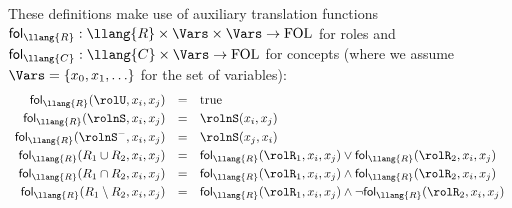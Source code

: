 \documentclass[10pt,a4paper]{amsart}
\theoremstyle{definition}
\numberwithin{equation}{section}
\theoremstyle{plain}
\theoremstyle{definition}
\theoremstyle{myexample}
\theoremstyle{plain}
\theoremstyle{definition}
\newcommand{\fcn}[1]{\mathsf{#1}}
\begin{document}
These definitions make use of auxiliary translation functions $ \fcn{fol}_ \llang{R}:  \llang{R} \times \Vars \times \Vars \to \mathrm{FOL}$ for roles and $ \fcn{fol}_ \llang{C}:  \llang{C} \times \Vars \to \mathrm{FOL}$ for concepts (where we assume $\Vars=\{x_0,x_1,\ldots\}$ for the set of variables):
\[
\begin{array}{rll}
	 \fcn{fol}_{ \llang{R}}(\rolU,x_i,x_j) & = & \mathrm{true} \\[1mm]
	 \fcn{fol}_{ \llang{R}}(\rolnS,x_i,x_j) & = & \rolnS(x_i,x_j) \\[1mm]
	 \fcn{fol}_{ \llang{R}}(\rolnS^-,x_i,x_j) & = & \rolnS(x_j,x_i) \\[1mm]
	 \fcn{fol}_{ \llang{R}}(R_1 \cup R_2,x_i,x_j) & = & \fcn{fol}_{ \llang{R}}(\rolR_1,x_i,x_j) \vee \fcn{fol}_{ \llang{R}}(\rolR_2,x_i,x_j) \\[1mm]
	 \fcn{fol}_{ \llang{R}}(R_1 \cap R_2,x_i,x_j) & = & \fcn{fol}_{ \llang{R}}(\rolR_1,x_i,x_j) \wedge \fcn{fol}_{ \llang{R}}(\rolR_2,x_i,x_j) \\[1mm]
	 \fcn{fol}_{ \llang{R}}(R_1 \setminus R_2,x_i,x_j) & = & \fcn{fol}_{ \llang{R}}(\rolR_1,x_i,x_j) \wedge \neg\fcn{fol}_{ \llang{R}}(\rolR_2,x_i,x_j)
\end{array}
\]
\end{document}
